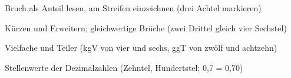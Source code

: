 \setcounter{aufgabe}{0}

\begin{aufgabe}{Bruch als Anteil lesen, am Streifen einzeichnen (drei Achtel markieren)}
\end{aufgabe}

\begin{aufgabe}{Kürzen und Erweitern; gleichwertige Brüche (zwei Drittel gleich vier Sechstel)}
\end{aufgabe}

\begin{aufgabe}{Vielfache und Teiler (kgV von vier und sechs, ggT von zwölf und achtzehn)}
\end{aufgabe}

\begin{aufgabe}{Stellenwerte der Dezimalzahlen (Zehntel, Hundertstel; 0,7 = 0,70)}
\end{aufgabe}

